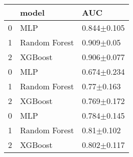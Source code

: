 \begin{tabular}{lll}
\toprule
 & model & AUC \\
\midrule
0 & MLP & 0.844$\pm$0.105 \\
1 & Random Forest & 0.909$\pm$0.05 \\
2 & XGBoost & 0.906$\pm$0.077 \\
0 & MLP & 0.674$\pm$0.234 \\
1 & Random Forest & 0.77$\pm$0.163 \\
2 & XGBoost & 0.769$\pm$0.172 \\
0 & MLP & 0.784$\pm$0.145 \\
1 & Random Forest & 0.81$\pm$0.102 \\
2 & XGBoost & 0.802$\pm$0.117 \\
\bottomrule
\end{tabular}
